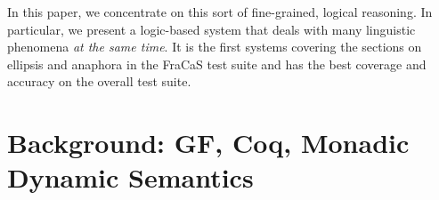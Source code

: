 \documentclass[11pt]{article}
\begin{document}
In this paper, we concentrate on this sort of fine-grained, logical
reasoning. In particular, we present a logic-based system that deals
with many linguistic phenomena \emph{at the same time}. It is the
first systems covering the sections on ellipsis and anaphora in the
FraCaS test suite and has the best coverage and accuracy on the
overall test suite.

\section{Background: GF, Coq, Monadic Dynamic Semantics}
\end{document}
